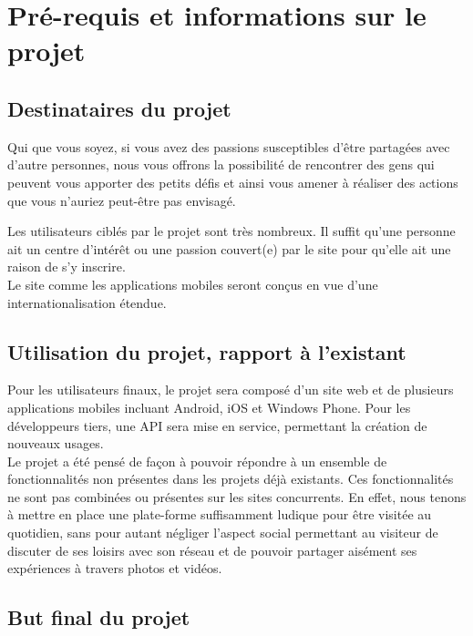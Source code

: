 \documentclass{life-fr}
\begin{document}
\section{Pré-requis et informations sur le projet}

\subsection{Destinataires du projet}

Qui que vous soyez, si vous avez des passions susceptibles d'être partagées avec d'autre personnes, nous vous offrons la possibilité de rencontrer des gens qui peuvent vous apporter des petits défis et ainsi vous amener à réaliser des actions que vous n'auriez peut-être pas envisagé.

Les utilisateurs ciblés par le projet sont très nombreux. Il suffit qu'une personne ait un centre d'intérêt ou une passion couvert(e) par le site pour qu'elle ait une raison de s'y inscrire.\\

Le site comme les applications mobiles seront conçus en vue d'une internationalisation étendue.

\subsection{Utilisation du projet, rapport à l'existant}

Pour les utilisateurs finaux, le projet sera composé d'un site web et de plusieurs applications mobiles incluant Android, iOS et Windows Phone. Pour les développeurs tiers, une API sera mise en service, permettant la création de nouveaux usages.\\

Le projet a été pensé de façon à pouvoir répondre à un ensemble de fonctionnalités non présentes dans les projets déjà existants. Ces fonctionnalités ne sont pas combinées ou présentes sur les sites concurrents. En effet, nous tenons à mettre en place une plate-forme suffisamment ludique pour être visitée au quotidien, sans pour autant négliger l’aspect social permettant au visiteur de discuter de ses loisirs avec son réseau et de pouvoir partager aisément ses expériences à travers photos et vidéos.\\

\newpage

\subsection{But final du projet}
\end{document}
